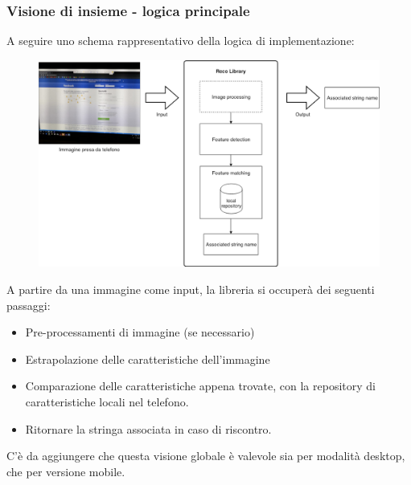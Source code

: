 \documentclass[twoside]{supsistudent}
\begin{document}
\subsubsection{Visione di insieme - logica principale}
A seguire uno schema rappresentativo della logica di implementazione:
\begin{figure}[h!]
  \centering
    \includegraphics[width=1\textwidth]{Pictures/library_components.png}
\end{figure}
\newline
A partire da una immagine come input, la libreria si occuperà dei seguenti passaggi:
\begin{itemize}
\item Pre-processamenti di immagine (se necessario)
\item Estrapolazione delle caratteristiche dell'immagine
\item Comparazione delle caratteristiche appena trovate, con la repository di caratteristiche locali nel telefono.
\item Ritornare la stringa associata in caso di riscontro.
\end{itemize}

C'è da aggiungere che questa visione globale è valevole sia per modalità desktop, che per versione mobile.

\newpage
\end{document}
